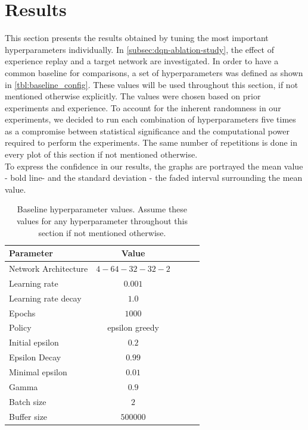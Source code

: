 \documentclass{article}
\begin{document}
\section{Results}
\label{sec:results}
This section presents the results obtained by tuning the most important hyperparameters individually. 
In \autoref{subsec:dqn-ablation-study}, the effect of experience replay and a target network are investigated.
In order to have a common baseline for comparisons, a set of hyperparameters was defined as shown in \autoref{tbl:baseline_config}. 
These values will be used throughout this section, if not mentioned otherwise explicitly.
The values were chosen based on prior experiments and experience.
To account for the inherent randomness in our experiments,
we decided to run each combination of hyperparameters five times as a compromise between statistical significance and the computational power required to perform the experiments. The same number of repetitions is done in every plot of this section if not mentioned otherwise.\\
To express the confidence in our results, the graphs are portrayed the mean value - bold line- and the standard deviation - the faded interval surrounding the mean value.   

\begin{table}[ht]
   \caption{Baseline hyperparameter values. Assume these values for any hyperparameter throughout this section if not mentioned otherwise.}
   \label{tbl:baseline_config}
   \vskip 0.15in
   \begin{center}
   \begin{small}
   \begin{sc}
   \begin{tabular}{lcccr}
   \toprule
   Parameter & Value \\
   \midrule
   Network Architecture    & $4-64-32-32-2$ \\
   Learning rate           & $0.001$ \\
   Learning rate decay     & $1.0$   \\
   Epochs                  & $1000$ \\
   Policy                  & epsilon greedy \\
   Initial epsilon         & $0.2$ \\
   Epsilon Decay           & $0.99$ \\
   Minimal epsilon         & $0.01$ \\
   Gamma                   & $0.9$ \\
   Batch size              & $2$ \\
   Buffer size             & $500000$ \\
   \bottomrule
   \end{tabular}
   \end{sc}
   \end{small}
   \end{center}
   \vskip -0.1in
\end{table}
\end{document}
